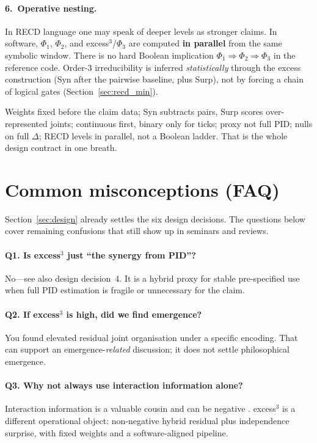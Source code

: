 \documentclass[11pt,a4paper]{article}
\begin{document}
\paragraph{6.\ Operative nesting.}
In RECD language one may speak of deeper levels as stronger claims. In
software, $\Phi_1$, $\Phi_2$, and excess$^3$/$\Phi_3$ are computed
\textbf{in parallel} from the same symbolic window. There is no hard
Boolean implication $\Phi_1\Rightarrow\Phi_2\Rightarrow\Phi_3$ in the
reference code. Order-3 irreducibility is inferred \emph{statistically}
through the excess construction (Syn after the pairwise baseline, plus
Surp), not by forcing a chain of logical gates
(Section~\ref{sec:recd_min}).

\begin{keyidea}
Weights fixed before the claim data; Syn subtracts pairs, Surp scores
over-represented joints; continuous first, binary only for ticks; proxy not
full PID; nulls on full $\Delta$; RECD levels in parallel, not a Boolean
ladder. That is the whole design contract in one breath.
\end{keyidea}

\section{Common misconceptions (FAQ)}
\label{sec:faq}

Section~\ref{sec:design} already settles the six design decisions. The
questions below cover remaining confusions that still show up in seminars
and reviews.

\paragraph{Q1. Is excess$^3$ just ``the synergy from PID''?}
No---see also design decision~4. It is a hybrid proxy for stable
pre-specified use when full PID estimation is fragile or unnecessary for
the claim.

\paragraph{Q2. If excess$^3$ is high, did we find emergence?}
You found elevated residual joint organisation under a specific encoding.
That can support an emergence-\emph{related} discussion; it does not settle
philosophical emergence.

\paragraph{Q3. Why not always use interaction information alone?}
Interaction information is a valuable cousin and can be negative
\citep{McGill1954,Timme2018}. excess$^3$ is a different operational object:
non-negative hybrid residual plus independence surprise, with fixed weights
and a software-aligned pipeline.
\end{document}
